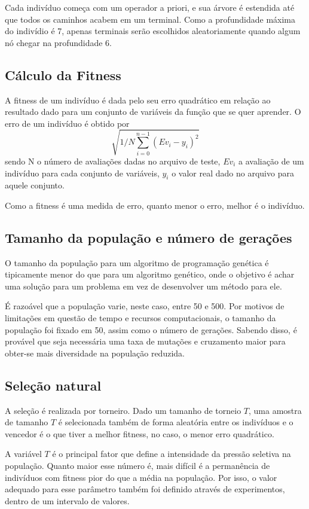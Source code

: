 \documentclass[11pt]{article}
\begin{document}
Cada indivíduo começa com um operador a priori, e sua árvore é estendida até que todos os caminhos acabem em um terminal. Como a profundidade máxima do indivídio é 7, apenas terminais serão escolhidos aleatoriamente quando algum nó chegar na profundidade 6.

\subsection*{Cálculo da Fitness}

A fitness de um indivíduo é dada pelo seu erro quadrático em relação ao resultado dado para um conjunto de variáveis da função que se quer aprender. O erro de um indivíduo é obtido por $$\sqrt{1/N\sum\limits_{i=0}^{n-1} (Ev_i - y_i)^2}$$ sendo N o número de avaliações dadas no arquivo de teste, $Ev_i$ a avaliação de um indivíduo para cada conjunto de variáveis, $y_i$ o valor real dado no arquivo para aquele conjunto.

Como a fitness é uma medida de erro, quanto menor o erro, melhor é o indivíduo.

\subsection*{Tamanho da população e número de gerações}

O tamanho da população para um algoritmo de programação genética é tipicamente menor do que para um algoritmo genético, onde o objetivo é achar uma solução para um problema em vez de desenvolver um método para ele.

É razoável que a população varie, neste caso, entre 50 e 500. Por motivos de limitações em questão de tempo e recursos computacionais, o tamanho da população foi fixado em 50, assim como o número de gerações. Sabendo disso, é provável que seja necessária uma taxa de mutações e cruzamento maior para obter-se mais diversidade na população reduzida.

\subsection*{Seleção natural}

A seleção é realizada por torneiro. Dado um tamanho de torneio $T$, uma amostra de tamanho $T$ é selecionada também de forma aleatória entre os indivíduos e o vencedor é o que tiver a melhor fitness, no caso, o menor erro quadrático. 

A variável $T$ é o principal fator que define a intensidade da pressão seletiva na população. Quanto maior esse número é, mais difícil é a permanência de indivíduos com fitness pior do que a média na população. Por isso, o valor adequado para esse parâmetro também foi definido através de experimentos, dentro de um intervalo de valores.
\end{document}
